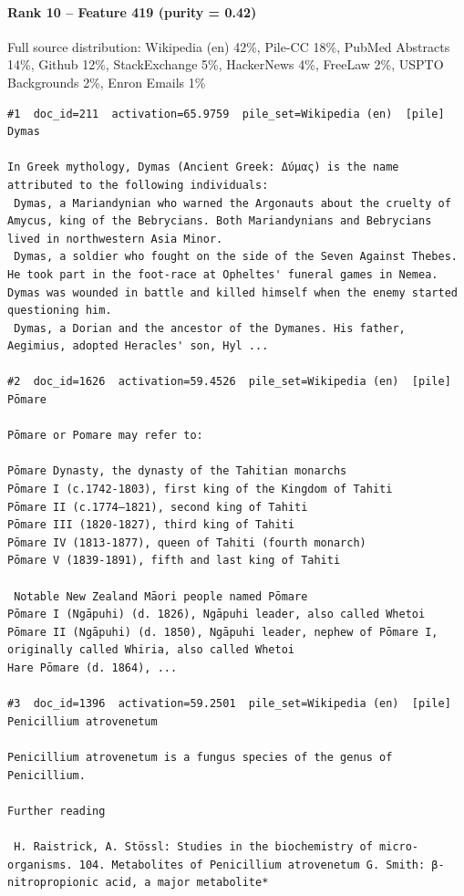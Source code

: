 \paragraph*{Rank 10 -- Feature 419 (purity = 0.42)}

Full source distribution: Wikipedia (en) 42\%, Pile-CC 18\%, PubMed Abstracts 14\%, Github 12\%, StackExchange 5\%, HackerNews 4\%, FreeLaw 2\%, USPTO Backgrounds 2\%, Enron Emails 1\%

\begin{verbatim}
#1  doc_id=211  activation=65.9759  pile_set=Wikipedia (en)  [pile]
Dymas

In Greek mythology, Dymas (Ancient Greek: Δύμας) is the name attributed to the following individuals:
 Dymas, a Mariandynian who warned the Argonauts about the cruelty of Amycus, king of the Bebrycians. Both Mariandynians and Bebrycians lived in northwestern Asia Minor.
 Dymas, a soldier who fought on the side of the Seven Against Thebes. He took part in the foot-race at Opheltes' funeral games in Nemea. Dymas was wounded in battle and killed himself when the enemy started questioning him.
 Dymas, a Dorian and the ancestor of the Dymanes. His father, Aegimius, adopted Heracles' son, Hyl ...

#2  doc_id=1626  activation=59.4526  pile_set=Wikipedia (en)  [pile]
Pōmare

Pōmare or Pomare may refer to:

Pōmare Dynasty, the dynasty of the Tahitian monarchs
Pōmare I (c.1742-1803), first king of the Kingdom of Tahiti
Pōmare II (c.1774–1821), second king of Tahiti
Pōmare III (1820-1827), third king of Tahiti
Pōmare IV (1813-1877), queen of Tahiti (fourth monarch)
Pōmare V (1839-1891), fifth and last king of Tahiti

 Notable New Zealand Māori people named Pōmare
Pōmare I (Ngāpuhi) (d. 1826), Ngāpuhi leader, also called Whetoi
Pōmare II (Ngāpuhi) (d. 1850), Ngāpuhi leader, nephew of Pōmare I, originally called Whiria, also called Whetoi
Hare Pōmare (d. 1864), ...

#3  doc_id=1396  activation=59.2501  pile_set=Wikipedia (en)  [pile]
Penicillium atrovenetum

Penicillium atrovenetum is a fungus species of the genus of Penicillium.

Further reading

 H. Raistrick, A. Stössl: Studies in the biochemistry of micro-organisms. 104. Metabolites of Penicillium atrovenetum G. Smith: β-nitropropionic acid, a major metabolite*


\end{verbatim}
